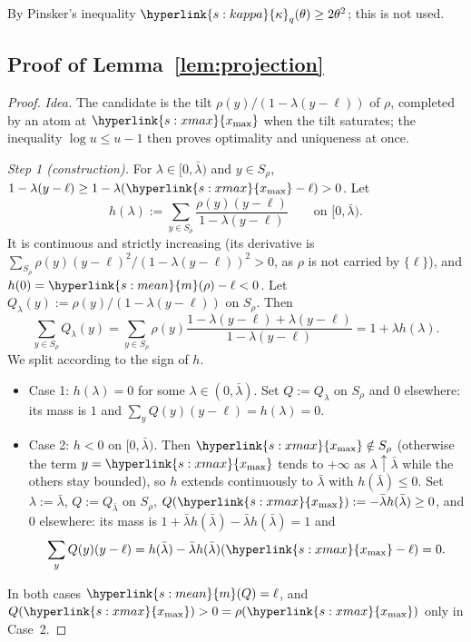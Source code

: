 \documentclass[11pt]{article}
\newcommand{\sy}[2]{{\hyperlink{#1}{#2}}}
\newcommand{\xmax}{\sy{s:xmax}{x_{\max}}}
\newcommand{\mean}{\sy{s:mean}{m}}
\newcommand{\kap}{\sy{s:kappa}{\kappa}}
\begin{document}
By Pinsker's inequality $\kap_q(\theta)\ge2\theta^2$; this is not used.

\subsection{Proof of Lemma~\ref{lem:projection}}\label{sec:proof-lem-projection}

\begin{proof}
\emph{Idea.} The candidate is the tilt $\rho(y)/(1-\lambda(y-\ell))$ of $\rho$, completed by an atom
at $\xmax$ when the tilt saturates; the inequality $\log u\le u-1$ then proves optimality and
uniqueness at once.

\emph{Step 1 (construction).} For $\lambda\in[0,\bar\lambda)$ and $y\in S_\rho$,
$1-\lambda(y-\ell)\ge1-\lambda(\xmax-\ell)>0$. Let
\begin{equation*}
h(\lambda):=\sum_{y\in S_\rho}\frac{\rho(y)(y-\ell)}{1-\lambda(y-\ell)}\qquad\text{on }[0,\bar\lambda).
\end{equation*}
It is continuous and strictly increasing (its derivative is
$\sum_{S_\rho}\rho(y)(y-\ell)^2/(1-\lambda(y-\ell))^2>0$, as $\rho$ is not carried by $\{\ell\}$),
and $h(0)=\mean(\rho)-\ell<0$. Let $Q_\lambda(y):=\rho(y)/(1-\lambda(y-\ell))$ on $S_\rho$. Then
\begin{equation*}
\sum_{y\in S_\rho}Q_\lambda(y)=\sum_{y\in S_\rho}\rho(y)\frac{1-\lambda(y-\ell)+\lambda(y-\ell)}{1-\lambda(y-\ell)}=1+\lambda h(\lambda).
\end{equation*}
We split according to the sign of $h$.
\begin{itemize}
\item Case 1: $h(\lambda)=0$ for some $\lambda\in(0,\bar\lambda)$. Set $Q:=Q_\lambda$ on $S_\rho$ and
  $0$ elsewhere: its mass is $1$ and $\sum_yQ(y)(y-\ell)=h(\lambda)=0$.
\item Case 2: $h<0$ on $[0,\bar\lambda)$. Then $\xmax\notin S_\rho$ (otherwise the term $y=\xmax$
  tends to $+\infty$ as $\lambda\uparrow\bar\lambda$ while the others stay bounded), so $h$ extends
  continuously to $\bar\lambda$ with $h(\bar\lambda)\le0$. Set $\lambda:=\bar\lambda$,
  $Q:=Q_{\bar\lambda}$ on $S_\rho$, $Q(\xmax):=-\bar\lambda h(\bar\lambda)\ge0$, and $0$ elsewhere:
  its mass is $1+\bar\lambda h(\bar\lambda)-\bar\lambda h(\bar\lambda)=1$ and
  \begin{equation*}
  \sum_yQ(y)(y-\ell)=h(\bar\lambda)-\bar\lambda h(\bar\lambda)(\xmax-\ell)=0.
  \end{equation*}
\end{itemize}
In both cases $\mean(Q)=\ell$, and $Q(\xmax)>0=\rho(\xmax)$ only in Case~2.


\end{proof}
\end{document}
